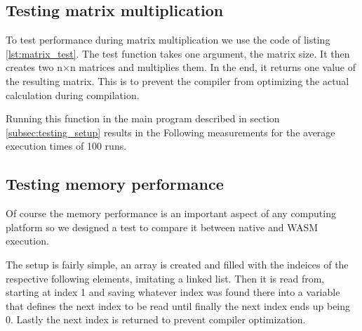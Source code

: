 \subsection{Testing matrix multiplication}
To test performance during matrix multiplication we use the code of listing \ref{lst:matrix_test}. The test function takes one argument, the matrix size. It then creates two n$\times$n matrices and multiplies them. In the end, it returns one value of the resulting matrix. This is to prevent the compiler from optimizing the actual calculation during compilation.



Running this function in the main program described in section \ref{subsec:testing_setup} results in the Following measurements for the average execution times of 100 runs.

\subsection{Testing memory performance}
Of course the memory performance is an important aspect of any computing platform so we designed a test to compare it between native and WASM execution.

The setup is fairly simple, an array is created and filled with the indeices of the respective following elements, imitating a linked list. Then it is read from, starting at index 1 and saving whatever index was found there into a variable that defines the next index to be read until finally the next index ends up being 0. Lastly the next index is returned to prevent compiler optimization.

